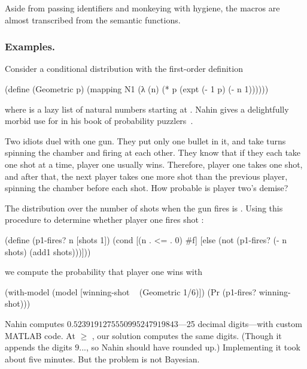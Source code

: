Aside from passing identifiers and monkeying with hygiene, the macros are almost transcribed from the semantic functions.

\subsubsection{Examples.}
Consider a conditional distribution with the first-order definition
\begin{center}
\singlespacing
\begin{schemedisplay}
(define (Geometric p)
  (mapping N1 (λ (n) (* p (expt (- 1 p) (- n 1))))))
\end{schemedisplay}
\end{center}
where  is a lazy list of natural numbers starting at . Nahin gives a delightfully morbid use for  in his book of probability puzzlers~\cite{cit:nahin-book}.

Two idiots duel with one gun. They put only one bullet in it, and take turns spinning the chamber and firing at each other. They know that if they each take one shot at a time, player one usually wins. Therefore, player one takes one shot, and after that, the next player takes one more shot than the previous player, spinning the chamber before each shot. How probable is player two's demise?

The distribution over the number of shots when the gun fires is . Using this procedure to determine whether player one fires shot :
\begin{center}
\singlespacing
\begin{schemedisplay}
(define (p1-fires? n [shots 1])
  (cond [(n . <= . 0)  #f]
        [else  (not (p1-fires? (- n shots) (add1 shots)))]))
\end{schemedisplay}
\end{center}
we compute the probability that player one wins with
\begin{center}
\singlespacing
\begin{schemedisplay}
(with-model (model [winning-shot ~ (Geometric 1/6)])
  (Pr (p1-fires? winning-shot)))
\end{schemedisplay}
\end{center}
Nahin computes $0.5239191275550995247919843$---25 decimal digits---with custom MATLAB code. At  $\ge$ , our solution computes the same digits. (Though it appends the digits $9...$, so Nahin should have rounded up.) Implementing it took about five minutes. But the problem is not Bayesian.

